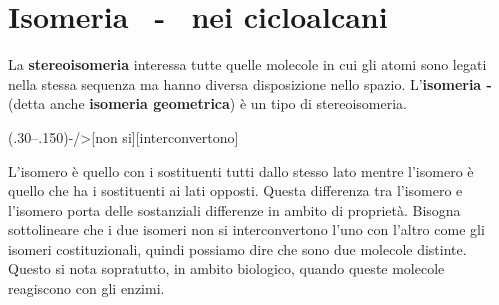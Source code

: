 \section{Isomeria \cis\texorpdfstring{\,\!}{} - \trans\texorpdfstring{\,\!}{} nei cicloalcani}
La \textbf{stereoisomeria} interessa tutte quelle molecole in cui gli atomi sono legati nella stessa sequenza ma hanno diversa disposizione nello spazio. L'\textbf{isomeria \cis-\trans\;\!} (detta anche \textbf{isomeria geometrica}) è un tipo di stereoisomeria.

\begingroup
{}
\begin{reaction*}
	\arrow(.30--.150){-/>[non si][interconvertono]}
\end{reaction*}
\endgroup

L'isomero \cis\;\! è quello con i sostituenti tutti dallo stesso lato mentre l'isomero \trans\;\! è quello che ha i sostituenti ai lati opposti. Questa differenza tra l'isomero \cis\;\! e l'isomero \trans\;\! porta delle sostanziali differenze in ambito di proprietà.  Bisogna sottolineare che i due isomeri non si interconvertono l'uno con l'altro come gli isomeri costituzionali, quindi possiamo dire che sono due molecole distinte. Questo si nota sopratutto, in ambito biologico, quando queste molecole reagiscono con gli enzimi.